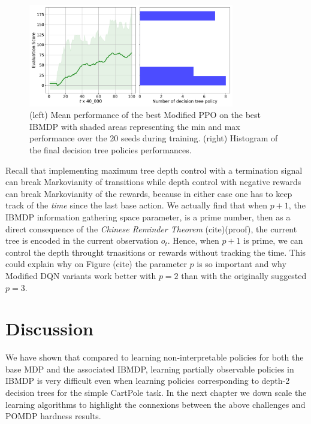 \begin{figure}
    \centering
    \includegraphics[width=0.8\textwidth]{images/images_part1/ppo_tree_study.pdf}
    \caption{(left) Mean performance of the best Modified PPO on the best IBMDP with shaded areas representing the min and max performance over the 20 seeds during training. (right) Histogram of the final decision tree policies performances.}
\end{figure}

Recall that implementing maximum tree depth control with a termination signal can break Markovianity of transitions while depth control with negative rewards can break Markovianity of the rewards, because in either case one has to keep track of the \textit{time} since the last base action.
We actually find that when $p+1$, the IBMDP information gathering space parameter, is a prime number, then as a direct consequence of the \textit{Chinese Reminder Theorem} (cite)(proof), the current tree is encoded in the current observation $o_t$. 
Hence, when $p+1$ is prime, we can control the depth throught trnasitions or rewards without tracking the time.
This could explain why on Figure (cite) the parameter $p$ is so important and why Modified DQN variants work better with $p=2$ than with the originally suggested $p=3$.


\section{Discussion}
We have shown that compared to learning non-interpretable policies for both the base MDP and the associated IBMDP, learning partially observable policies in IBMDP is very difficult even when learning policies corresponding to depth-2 decision trees for the simple CartPole task.
In the next chapter we down scale the learning algorithms to highlight the connexions between the above challenges and POMDP hardness results.